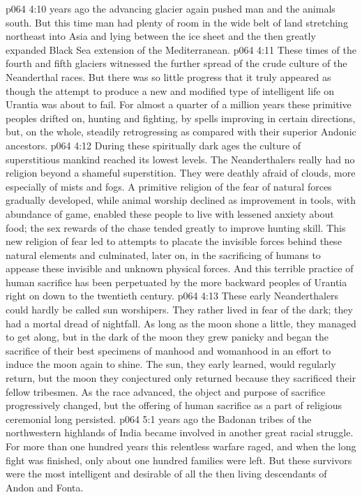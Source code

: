 \pc \vs p064 4:10  years ago the advancing glacier again pushed man and the animals south. But this time man had plenty of room in the wide belt of land stretching northeast into Asia and lying between the ice sheet and the then greatly expanded Black Sea extension of the Mediterranean.
\vs p064 4:11 These times of the fourth and fifth glaciers witnessed the further spread of the crude culture of the Neanderthal races. But there was so little progress that it truly appeared as though the attempt to produce a new and modified type of intelligent life on Urantia was about to fail. For almost a quarter of a million years these primitive peoples drifted on, hunting and fighting, by spells improving in certain directions, but, on the whole, steadily retrogressing as compared with their superior Andonic ancestors.
\pc \vs p064 4:12 During these spiritually dark ages the culture of superstitious mankind reached its lowest levels. The Neanderthalers really had no religion beyond a shameful superstition. They were deathly afraid of clouds, more especially of mists and fogs. A primitive religion of the fear of natural forces gradually developed, while animal worship declined as improvement in tools, with abundance of game, enabled these people to live with lessened anxiety about food; the sex rewards of the chase tended greatly to improve hunting skill. This new religion of fear led to attempts to placate the invisible forces behind these natural elements and culminated, later on, in the sacrificing of humans to appease these invisible and unknown physical forces. And this terrible practice of human sacrifice has been perpetuated by the more backward peoples of Urantia right on down to the twentieth century.\plusone
\vs p064 4:13 These early Neanderthalers could hardly be called sun worshipers. They rather lived in fear of the dark; they had a mortal dread of nightfall. As long as the moon shone a little, they managed to get along, but in the dark of the moon they grew panicky and began the sacrifice of their best specimens of manhood and womanhood in an effort to induce the moon again to shine. The sun, they early learned, would regularly return, but the moon they conjectured only returned because they sacrificed their fellow tribesmen. As the race advanced, the object and purpose of sacrifice progressively changed, but the offering of human sacrifice as a part of religious ceremonial long persisted.
\vs p064 5:1  years ago the Badonan tribes of the northwestern highlands of India became involved in another great racial struggle. For more than one hundred years this relentless warfare raged, and when the long fight was finished, only about one hundred families were left. But these survivors were the most intelligent and desirable of all the then living descendants of Andon and Fonta.

